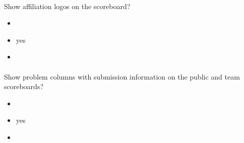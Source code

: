 \documentclass[a4paper,10pt,english,openany]{sphinxmanual}
\begin{document}
\paragraph{}
\label{\detokenize{configuration-reference:show-affiliation-logos}}
\sphinxAtStartPar
Show affiliation logos on the scoreboard?
\begin{itemize}
\item {} 
\sphinxAtStartPar
{} 

\item {} 
\sphinxAtStartPar
{} yes

\item {} 
\sphinxAtStartPar
{} 

\end{itemize}


\paragraph{}
\label{\detokenize{configuration-reference:show-teams-submissions}}
\sphinxAtStartPar
Show problem columns with submission information on the public and team scoreboards?
\begin{itemize}
\item {} 
\sphinxAtStartPar
{} 

\item {} 
\sphinxAtStartPar
{} yes

\item {} 
\sphinxAtStartPar
{} 

\end{itemize}
\end{document}
